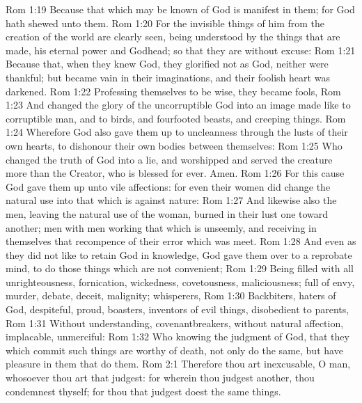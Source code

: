 \vs Rom 1:19 Because that which may be known of God is manifest in them; for God hath shewed  unto them.
\vs Rom 1:20 For the invisible things of him from the creation of the world are clearly seen, being understood by the things that are made,  his eternal power and Godhead; so that they are without excuse:
\vs Rom 1:21 Because that, when they knew God, they glorified  not as God, neither were thankful; but became vain in their imaginations, and their foolish heart was darkened.
\vs Rom 1:22 Professing themselves to be wise, they became fools,
\vs Rom 1:23 And changed the glory of the uncorruptible God into an image made like to corruptible man, and to birds, and fourfooted beasts, and creeping things.
\vs Rom 1:24 Wherefore God also gave them up to uncleanness through the lusts of their own hearts, to dishonour their own bodies between themselves:
\vs Rom 1:25 Who changed the truth of God into a lie, and worshipped and served the creature more than the Creator, who is blessed for ever. Amen.
\vs Rom 1:26 For this cause God gave them up unto vile affections: for even their women did change the natural use into that which is against nature:
\vs Rom 1:27 And likewise also the men, leaving the natural use of the woman, burned in their lust one toward another; men with men working that which is unseemly, and receiving in themselves that recompence of their error which was meet.
\vs Rom 1:28 And even as they did not like to retain God in  knowledge, God gave them over to a reprobate mind, to do those things which are not convenient;
\vs Rom 1:29 Being filled with all unrighteousness, fornication, wickedness, covetousness, maliciousness; full of envy, murder, debate, deceit, malignity; whisperers,
\vs Rom 1:30 Backbiters, haters of God, despiteful, proud, boasters, inventors of evil things, disobedient to parents,
\vs Rom 1:31 Without understanding, covenantbreakers, without natural affection, implacable, unmerciful:
\vs Rom 1:32 Who knowing the judgment of God, that they which commit such things are worthy of death, not only do the same, but have pleasure in them that do them.
\vs Rom 2:1 Therefore thou art inexcusable, O man, whosoever thou art that judgest: for wherein thou judgest another, thou condemnest thyself; for thou that judgest doest the same things.
